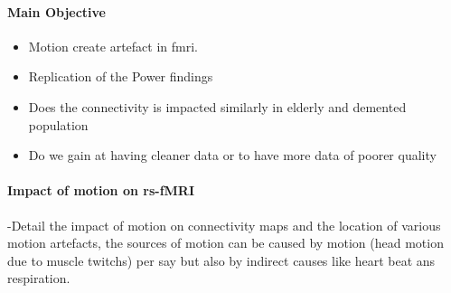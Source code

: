 \documentclass[authoryear,preprint,review]{elsarticle}
\begin{document}
\paragraph{Main Objective} 
\begin{itemize}
 \item Motion create artefact in fmri.
 \item Replication of the Power findings
 \item Does the connectivity is impacted similarly in elderly and demented population
 \item Do we gain at having cleaner data or to have more data of poorer quality
\end{itemize}


\paragraph{Impact of motion on rs-fMRI} 
-Detail the impact of motion on connectivity maps and the location of various motion artefacts, the sources of motion can be caused by motion (head motion due to muscle twitchs) per say but also by indirect causes like heart beat ans respiration.
\end{document}
